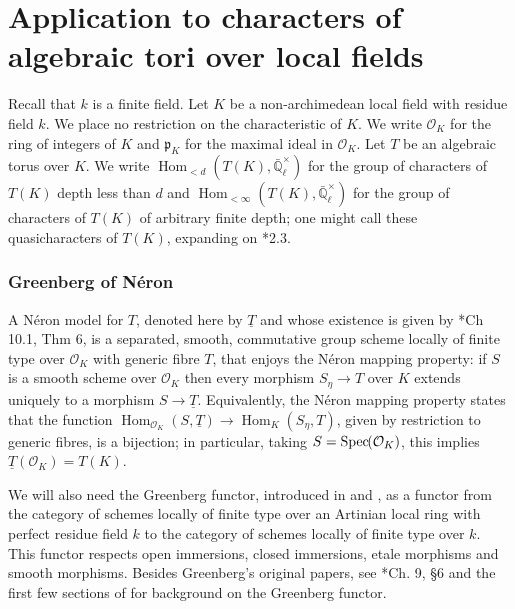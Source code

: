 \documentclass[11pt]{amsart}
\theoremstyle{plain}
\theoremstyle{definition}
\theoremstyle{remark}
\newcommand{\Spec}[1]{{\operatorname{Spec}\hskip-1pt( #1 )}}
\newcommand{\EE}{\mathbb{\bar Q}_\ell}
\newcommand{\OK}{\mathcal{O}_K}
\newcommand{\pK}{\mathfrak{p}_K}
\newcommand{\Fq}{k}
\newcommand{\EEx}{\EE^\times}
\DeclareMathOperator{\Hom}{Hom}
\newcommand{\ceq}{{\, :=\, }}
\newcommand{\TT}{\underline{T}}
\begin{document}
\part{Application to characters of algebraic tori over local fields}

Recall that $\Fq$ is a finite field.
Let $K$ be a non-archimedean local field with residue field $\Fq$.
We place no restriction on the characteristic of $K$. 
We write $\OK$ for the ring of integers of $K$ and $\pK$ for the maximal ideal in $\OK$. 
Let $T$ be an algebraic torus over $K$.
We write $\Hom_{< d}(T(K),\EEx)$ for the group of characters of $T(K)$ depth less than $d$ 
and $\Hom_{<\infty}(T(K),\EEx)$ for the group of characters of $T(K)$ of arbitrary finite depth;
one might call these quasicharacters of $T(K)$, expanding on \cite{tate:67a}*{2.3}.

\section{Greenberg of N\'eron}
\label{sec:GN}

A N\'eron model for $T$, denoted here by $\TT$ 
and whose existence is given by \cite{bosch-lutkebohmert-reynaud:NeronModels}*{Ch 10.1, Thm 6},
is a separated, smooth, commutative group scheme locally of finite type over $\OK$ with generic fibre $T$,
that enjoys the N\'eron mapping property:
if $S$ is a smooth scheme over $\OK$ then every morphism $S_\eta \to T$
over $K$ extends uniquely to a morphism $S \to \TT$. 
Equivalently, the
N\'eron mapping property states that the function
$\Hom_{\OK} (S,\TT) \to \Hom_K(S_\eta,T)$, given by restriction to
generic fibres, is a bijection; 
in particular, taking $S = \Spec{\OK}$, this implies $\TT(\OK) = T(K)$.

We will also need the Greenberg functor, 
introduced in \cite{greenberg:61} and \cite{greenberg:63a}, 
as a functor from the category of schemes locally of finite type 
over an Artinian local ring with perfect residue field $k$ 
to the category of schemes locally of finite type over $k$. 
This functor respects open immersions, closed immersions, 
etale morphisms and smooth morphisms. 
Besides Greenberg's original papers, 
see \cite{bosch-lutkebohmert-reynaud:NeronModels}*{Ch. 9, \S 6} 
and the first few sections of \cite{stasinski:12a} 
for background on the Greenberg functor. 
\end{document}
